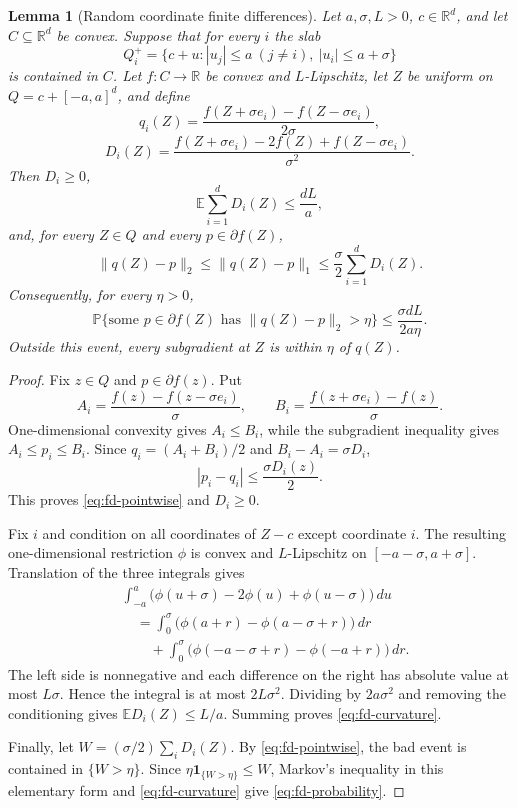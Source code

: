 \documentclass[11pt]{article}
\numberwithin{equation}{section}
\newtheorem{lemma}[lemma]{Lemma}
\theoremstyle{remark}
\theoremstyle{definition}
\newcommand{\R}{\mathbb{R}}
\newcommand{\E}{\mathbb{E}}
\newcommand{\Pp}{\mathbb{P}}
\newcommand{\norm}[1]{\lVert #1\rVert_2}
\newcommand{\ind}{\mathbf{1}}
\begin{document}
\begin{lemma}[Random coordinate finite differences]
\label{lem:random-fd}
Let $a,\sigma,L>0$, $c\in\R^d$, and let $C\subseteq\R^d$ be convex.  Suppose that for every $i$ the slab
\[
Q_i^+=\{c+u: |u_j|\le a\ (j\ne i),\ |u_i|\le a+\sigma\}
\]
is contained in $C$.  Let $f:C\to\R$ be convex and $L$-Lipschitz, let $Z$ be uniform on $Q=c+[-a,a]^d$, and define
\[
q_i(Z)=\frac{f(Z+\sigma e_i)-f(Z-\sigma e_i)}{2\sigma},
\]
\[
D_i(Z)=\frac{f(Z+\sigma e_i)-2f(Z)+f(Z-\sigma e_i)}{\sigma^2}.
\]
Then $D_i\ge0$,
\begin{equation}
\E\sum_{i=1}^dD_i(Z)\le\frac{dL}{a},
\label{eq:fd-curvature}
\end{equation}
and, for every $Z\in Q$ and every $p\in\partial f(Z)$,
\begin{equation}
\norm{q(Z)-p}
\le\lVert q(Z)-p\rVert_1
\le\frac\sigma2\sum_{i=1}^dD_i(Z).
\label{eq:fd-pointwise}
\end{equation}
Consequently, for every $\eta>0$,
\begin{equation}
\Pp\{\text{some }p\in\partial f(Z)\text{ has }\norm{q(Z)-p}>\eta\}
\le\frac{\sigma dL}{2a\eta}.
\label{eq:fd-probability}
\end{equation}
Outside this event, every subgradient at $Z$ is within $\eta$ of $q(Z)$.
\end{lemma}

\begin{proof}
Fix $z\in Q$ and $p\in\partial f(z)$.  Put
\[
A_i=\frac{f(z)-f(z-\sigma e_i)}\sigma,
\qquad
B_i=\frac{f(z+\sigma e_i)-f(z)}\sigma.
\]
One-dimensional convexity gives $A_i\le B_i$, while the subgradient inequality gives $A_i\le p_i\le B_i$.  Since $q_i=(A_i+B_i)/2$ and $B_i-A_i=\sigma D_i$,
\[
|p_i-q_i|\le\frac{\sigma D_i(z)}2.
\]
This proves \eqref{eq:fd-pointwise} and $D_i\ge0$.

Fix $i$ and condition on all coordinates of $Z-c$ except coordinate $i$.  The resulting one-dimensional restriction $\phi$ is convex and $L$-Lipschitz on $[-a-\sigma,a+\sigma]$.  Translation of the three integrals gives
\begin{align*}
&\int_{-a}^{a}\bigl(\phi(u+\sigma)-2\phi(u)+\phi(u-\sigma)\bigr)\,du\\
&\quad=\int_0^\sigma\bigl(\phi(a+r)-\phi(a-\sigma+r)\bigr)\,dr\\
&\qquad+\int_0^\sigma\bigl(\phi(-a-\sigma+r)-\phi(-a+r)\bigr)\,dr.
\end{align*}
The left side is nonnegative and each difference on the right has absolute value at most $L\sigma$.  Hence the integral is at most $2L\sigma^2$.  Dividing by $2a\sigma^2$ and removing the conditioning gives $\E D_i(Z)\le L/a$.  Summing proves \eqref{eq:fd-curvature}.

Finally, let $W=(\sigma/2)\sum_iD_i(Z)$.  By \eqref{eq:fd-pointwise}, the bad event is contained in $\{W>\eta\}$.  Since $\eta\ind_{\{W>\eta\}}\le W$, Markov's inequality in this elementary form and \eqref{eq:fd-curvature} give \eqref{eq:fd-probability}.
\end{proof}
\end{document}

